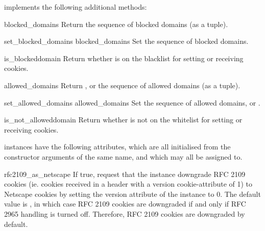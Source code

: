  implements the following additional
methods:

\begin{methoddesc}[DefaultCookiePolicy]{blocked_domains}{}
Return the sequence of blocked domains (as a tuple).
\end{methoddesc}

\begin{methoddesc}[DefaultCookiePolicy]{set_blocked_domains}
  {blocked_domains}
Set the sequence of blocked domains.
\end{methoddesc}

\begin{methoddesc}[DefaultCookiePolicy]{is_blocked}{domain}
Return whether  is on the blacklist for setting or
receiving cookies.
\end{methoddesc}

\begin{methoddesc}[DefaultCookiePolicy]{allowed_domains}{}
Return , or the sequence of allowed domains (as a tuple).
\end{methoddesc}

\begin{methoddesc}[DefaultCookiePolicy]{set_allowed_domains}
  {allowed_domains}
Set the sequence of allowed domains, or .
\end{methoddesc}

\begin{methoddesc}[DefaultCookiePolicy]{is_not_allowed}{domain}
Return whether  is not on the whitelist for setting or
receiving cookies.
\end{methoddesc}

 instances have the following attributes,
which are all initialised from the constructor arguments of the same
name, and which may all be assigned to.

\begin{memberdesc}[DefaultCookiePolicy]{rfc2109_as_netscape}
If true, request that the  instance downgrade RFC
2109 cookies (ie. cookies received in a  header
with a version cookie-attribute of 1) to Netscape cookies by setting
the version attribute of the  instance to 0.  The
default value is , in which case RFC 2109 cookies are
downgraded if and only if RFC 2965 handling is turned off.  Therefore,
RFC 2109 cookies are downgraded by default.
\end{memberdesc}

